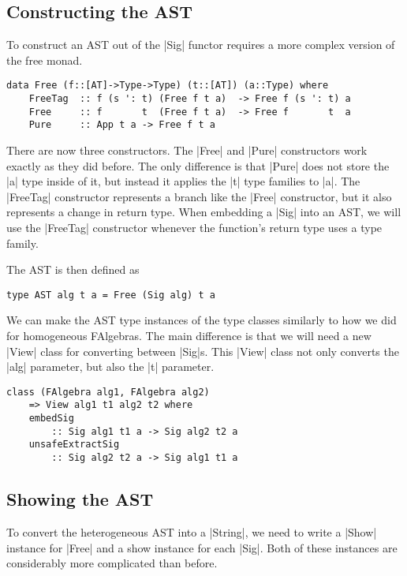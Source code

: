 \documentclass[preprint]{sigplanconf}
\theoremstyle{definition}
\begin{document}
\subsection{Constructing the AST}

To construct an AST out of the |Sig| functor requires a more complex version of the free monad.
\begin{lstlisting}
data Free (f::[AT]->Type->Type) (t::[AT]) (a::Type) where
    FreeTag  :: f (s ': t) (Free f t a)  -> Free f (s ': t) a
    Free     :: f       t  (Free f t a)  -> Free f       t  a
    Pure     :: App t a -> Free f t a
\end{lstlisting}
There are now three constructors.
The |Free| and |Pure| constructors work exactly as they did before.
The only difference is that |Pure| does not store the |a| type inside of it,
but instead it applies the |t| type families to |a|.
The |FreeTag| constructor represents a branch like the |Free| constructor,
but it also represents a change in return type.
When embedding a |Sig| into an AST,
we will use the |FreeTag| constructor whenever the function's return type uses a type family.

The AST is then defined as
\begin{lstlisting}
type AST alg t a = Free (Sig alg) t a
\end{lstlisting}

We can make the AST type instances of the type classes similarly to how we did for homogeneous FAlgebras.
The main difference is that we will need a new |View| class for converting between |Sig|s.
This |View| class not only converts the |alg| parameter, but also the |t| parameter.
\begin{lstlisting}
class (FAlgebra alg1, FAlgebra alg2)
    => View alg1 t1 alg2 t2 where
    embedSig
        :: Sig alg1 t1 a -> Sig alg2 t2 a
    unsafeExtractSig
        :: Sig alg2 t2 a -> Sig alg1 t1 a
\end{lstlisting}


\subsection{Showing the AST}

To convert the heterogeneous AST into a |String|,
we need to write a |Show| instance for |Free| and a show instance for each |Sig|.
Both of these instances are considerably more complicated than before.
\end{document}

